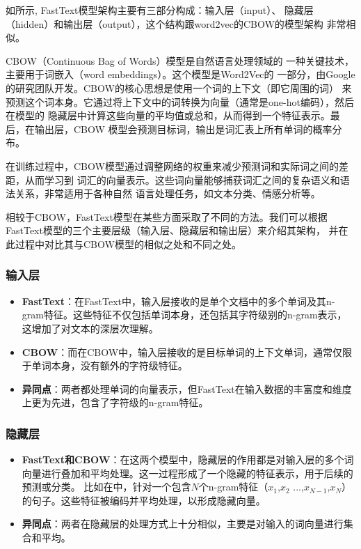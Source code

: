 如所示, FastText模型架构主要有三部分构成：输入层（input）、
隐藏层（hidden）和输出层（output），这个结构跟word2vec的CBOW\cite{mikolov2013efficient}的模型架构
非常相似。

CBOW（Continuous Bag of Words）模型是自然语言处理领域的
一种关键技术，主要用于词嵌入（word embeddings）。这个模型是Word2Vec的
一部分，由Google的研究团队开发。CBOW的核心思想是使用一个词的上下文（即它周围的词）
来预测这个词本身。它通过将上下文中的词转换为向量（通常是one-hot编码），然后在模型的
隐藏层中计算这些向量的平均值或总和，从而得到一个特征表示。最后，在输出层，CBOW
模型会预测目标词，输出是词汇表上所有单词的概率分布。

在训练过程中，CBOW模型通过调整网络的权重来减少预测词和实际词之间的差距，从而学习到
词汇的向量表示。这些词向量能够捕获词汇之间的复杂语义和语法关系，非常适用于各种自然
语言处理任务，如文本分类、情感分析等。

相较于CBOW，FastText模型在某些方面采取了不同的方法。我们可以根据FastText模型的三个主要层级（输入层、隐藏层和输出层）来介绍其架构，
并在此过程中对比其与CBOW模型的相似之处和不同之处。

\subsubsection*{输入层}
\begin{itemize}
    \item \textbf{FastText}：在FastText中，输入层接收的是单个文档中的多个单词及其n-gram特征。这些特征不仅包括单词本身，还包括其字符级别的n-gram表示，这增加了对文本的深层次理解。
    \item \textbf{CBOW}：而在CBOW中，输入层接收的是目标单词的上下文单词，通常仅限于单词本身，没有额外的字符级特征。
    \item \textbf{异同点}：两者都处理单词的向量表示，但FastText在输入数据的丰富度和维度上更为先进，包含了字符级的n-gram特征。
\end{itemize}

\subsubsection*{隐藏层}
\begin{itemize}
    \item \textbf{FastText和CBOW}：在这两个模型中，隐藏层的作用都是对输入层的多个词向量进行叠加和平均处理。这一过程形成了一个隐藏的特征表示，用于后续的预测或分类。
    比如在中，针对一个包含$N$个n-gram特征（$x_{1}$,$x_{2}$ ...,$x_{N-1}$,$x_{N}$）的句子。这些特征被编码并平均处理，以形成隐藏向量。
    \item \textbf{异同点}：两者在隐藏层的处理方式上十分相似，主要是对输入的词向量进行集合和平均。
\end{itemize}

